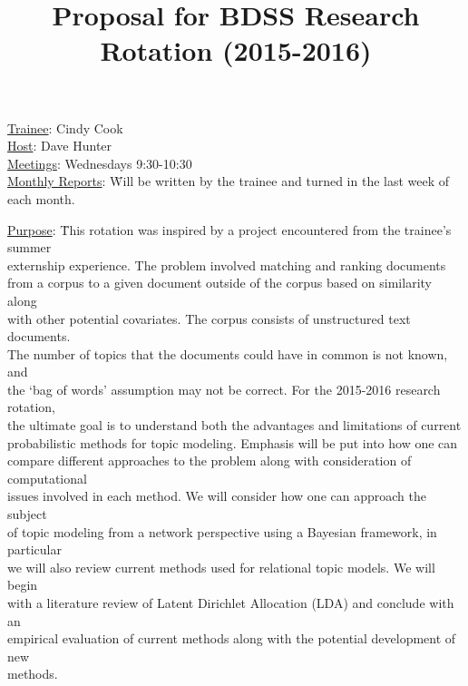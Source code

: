 \documentclass[12pt]{article}
\begin{document}
	\title{Proposal for BDSS Research Rotation (2015-2016)}
	\author{}
	\date{}
	\maketitle
	
	\begin{flushleft}
		\vspace{-20mm}
		\begin{tabbing}
		\underline{Trainee}:  Cindy Cook \\
		\underline{Host}:  Dave Hunter \\
		\underline{Meetings}: Wednesdays 9:30-10:30 \\
		\underline{Monthly Reports}: \= Will be written by the trainee and turned in the last week of each month.
		\end{tabbing}
	
		\vspace{2mm}
		\begin{tabbing}
		\underline{Purpose}: \=
		This rotation was inspired by a project encountered from the trainee's summer \\ \>externship experience. The problem involved matching and ranking documents \\ \>from a corpus to a given document outside of the corpus based on similarity along \\ \>with other potential covariates. The corpus consists of unstructured text documents. \\ \>The number of topics that the documents could have in common is not known, and \\ \>the `bag of words' assumption may not be correct. For the 2015-2016 research rotation, \\ \>the ultimate goal is to understand both the advantages and limitations of current \\ \>probabilistic methods for topic modeling. Emphasis will be put into how one can \\ \>compare different approaches to the problem along with consideration of computational \\ \>issues involved in each method. We will consider how one can approach the subject \\ \>of topic modeling from a network perspective using a Bayesian framework, in particular \\ \>we will also review current methods used for relational topic models. We will begin \\ \> with a literature review of Latent Dirichlet Allocation (LDA) and conclude with an \\ \>empirical evaluation of current methods along with the potential development of new \\ \>methods.
		\end{tabbing}
		

\end{flushleft}
\end{document}
